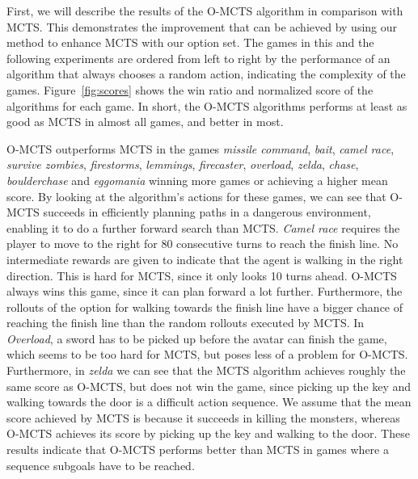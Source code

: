 First, we will describe the results of the O-MCTS algorithm in comparison with
MCTS\@.  This demonstrates the improvement that can be achieved by using our
method to enhance MCTS with our option set.  The games in this and the following
experiments are ordered from left to right by the performance of an algorithm
that always chooses a random action, indicating the complexity of the games.
Figure~\ref{fig:scores} shows the win ratio and normalized score of the
algorithms for each game. In short, the O-MCTS algorithms performs at least as
good as MCTS in almost all games, and better in most.

O-MCTS outperforms MCTS in the games \textit{missile command}, \textit{bait},
\textit{camel race}, \textit{survive zombies}, \textit{firestorms},
\textit{lemmings}, \textit{firecaster}, \textit{overload}, \textit{zelda},
\textit{chase}, \textit{boulderchase} and \textit{eggomania} winning more games
or achieving a higher mean score. By looking at the algorithm's actions for
these games, we can see that O-MCTS succeeds in efficiently planning paths in a
dangerous environment, enabling it to do a further forward search than MCTS\@. 
\textit{Camel race} requires the player to
move to the right for 80 consecutive turns to reach the finish line. No
intermediate rewards are given to indicate that the agent is walking in the
right direction. This is hard for MCTS, since it only looks 10 turns ahead.
O-MCTS always wins this game, since it can plan forward a lot further.
Furthermore, the rollouts of the option for walking towards the finish line have
a bigger chance of reaching the finish line than the random rollouts executed by
MCTS\@.
In \textit{Overload}, a sword has to be picked up before the avatar can finish the
game, which seems to be too hard for MCTS, but poses less of a problem for
O-MCTS\@.  Furthermore, in \textit{zelda} we can see that the MCTS algorithm
achieves roughly the same score as O-MCTS, but does not win the game, since
picking up the key and walking towards the door is a difficult action sequence.
We assume that the mean score achieved by MCTS is because it succeeds in killing
the monsters, whereas O-MCTS achieves its score by picking up the key and
walking to the door.  These results indicate that O-MCTS performs better than
MCTS in games where a sequence subgoals have to be reached.

